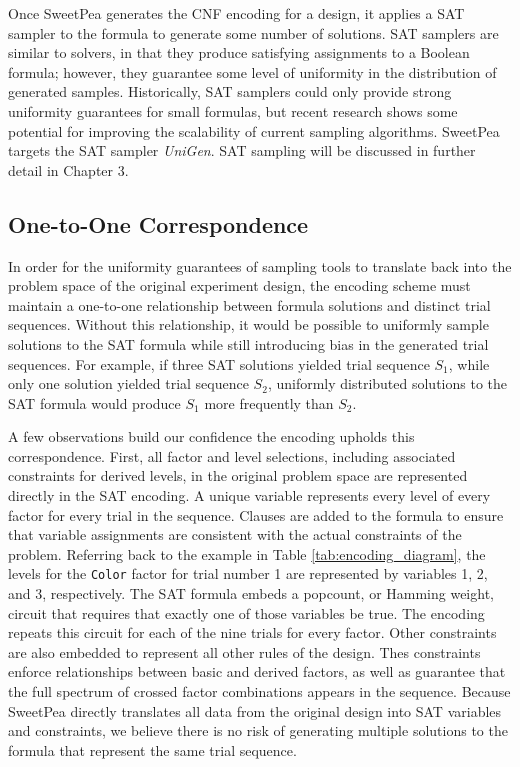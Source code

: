 Once SweetPea generates the CNF encoding for a design, it applies a SAT sampler to the formula to generate some number of solutions. SAT samplers are similar to solvers, in that they produce satisfying assignments to a Boolean formula; however, they guarantee some level of uniformity in the distribution of generated samples. Historically, SAT samplers could only provide strong uniformity guarantees for small formulas, but recent research shows some potential for improving the scalability of current sampling algorithms. SweetPea targets the SAT sampler \textit{UniGen}. SAT sampling will be discussed in further detail in Chapter 3.

\subsection{One-to-One Correspondence}

In order for the uniformity guarantees of sampling tools to translate back into the problem space of the original experiment design, the encoding scheme must maintain a one-to-one relationship between formula solutions and distinct trial sequences. Without this relationship, it would be possible to uniformly sample solutions to the SAT formula while still introducing bias in the generated trial sequences. For example, if three SAT solutions yielded trial sequence $S_1$, while only one solution yielded trial sequence $S_2$, uniformly distributed solutions to the SAT formula would produce $S_1$ more frequently than $S_2$.

A few observations build our confidence the encoding upholds this correspondence. First, all factor and level selections, including associated constraints for derived levels, in the original problem space are represented directly in the SAT encoding. A unique variable represents every level of every factor for every trial in the sequence. Clauses are added to the formula to ensure that variable assignments are consistent with the actual constraints of the problem. Referring back to the example in Table \ref{tab:encoding_diagram}, the levels for the \texttt{Color} factor for trial number 1 are represented by variables 1, 2, and 3, respectively. The SAT formula embeds a popcount, or Hamming weight, circuit that requires that exactly one of those variables be true. The encoding repeats this circuit for each of the nine trials for every factor. Other constraints are also embedded to represent all other rules of the design. Thes constraints enforce relationships between basic and derived factors, as well as guarantee that the full spectrum of crossed factor combinations appears in the sequence. Because SweetPea directly translates all data from the original design into SAT variables and constraints, we believe there is no risk of generating multiple solutions to the formula that represent the same trial sequence.

